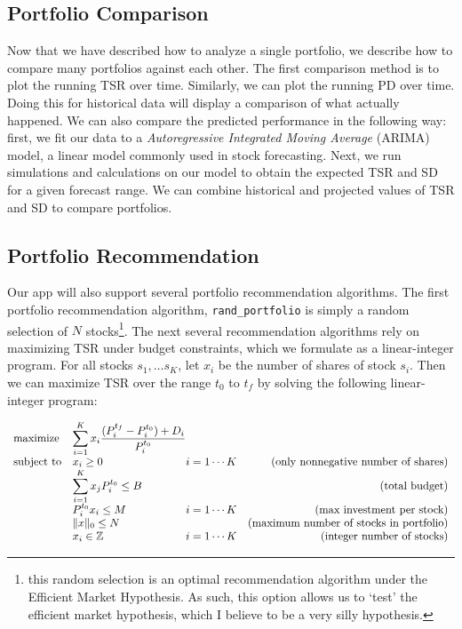 \documentclass{article}
\begin{document}
\subsection{Portfolio Comparison}
Now that we have described how to analyze a single portfolio, we describe how to compare many portfolios against each other. The first comparison method is to plot the running TSR over time. Similarly, we can plot the running PD over time. Doing this for historical data will display a comparison of what actually happened. We can also compare the predicted performance in the following way: first, we fit our data to a \emph{Autoregressive Integrated Moving Average} (ARIMA) model, a linear model commonly used in stock forecasting. Next, we run simulations and calculations on our model to obtain the expected TSR and SD for a given forecast range. We can combine historical and projected values of TSR and SD to compare portfolios.

\subsection{Portfolio Recommendation}
Our app will also support several portfolio recommendation algorithms. The first portfolio recommendation algorithm, \texttt{rand\_portfolio} is simply a random selection of $N$ stocks\footnote{this random selection is an optimal recommendation algorithm under the Efficient Market Hypothesis. As such, this option allows us to `test' the efficient market hypothesis, which I believe to be a very silly hypothesis.}. The next several recommendation algorithms rely on maximizing TSR under budget constraints, which we formulate as a linear-integer program. For all stocks $s_1, \dots s_K$, let $x_i$ be the number of shares of stock $s_i$. Then we can maximize TSR over the range $t_0$ to $t_f$ by solving the following linear-integer program:

\begin{equation*}
\begin{array}{ll@{}lr}
\text{maximize}  & \displaystyle\sum\limits_{i=1}^{K} x_i \frac{(P^{t_f}_{i} - P^{t_0}_{i}) + D_i}{P^{t_0}_{i}}&&\\
\text{subject to}& x_i \geq 0 & i =1 \cdots K & \text{(only nonnegative number of shares)} \\
                & \displaystyle\sum\limits_{i=1}^{K} x_{j} P^{t_0}_{i}  \leq B &&\text{(total budget)}\\
                 &   P^{t_0}_i x_i \leq M &i =1 \cdots K & \text{(max investment per stock)} \\
                 &  \| x \|_0 \leq N && \text{(maximum number of stocks in portfolio)} \\
                 & x_i \in \mathbb{Z}  &i =1 \cdots K & \text{(integer number of stocks)} \\
\end{array}
\end{equation*}
\end{document}
